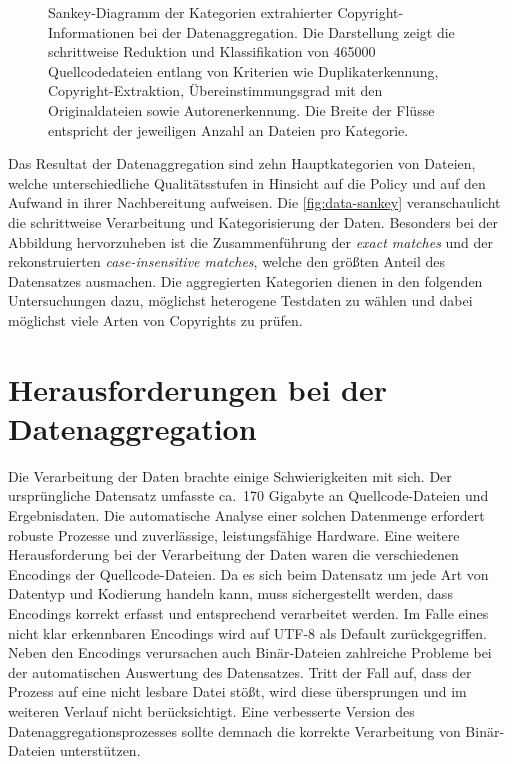 \begin{figure}[ht]
    \centering
    \caption{
Sankey-Diagramm der Kategorien extrahierter Copyright-Informationen bei der Datenaggregation. Die Darstellung zeigt die schrittweise Reduktion und Klassifikation von \num{465000} Quellcodedateien entlang von Kriterien wie Duplikaterkennung, Copyright-Extraktion, Übereinstimmungsgrad mit den Originaldateien sowie Autorenerkennung. Die Breite der Flüsse entspricht der jeweiligen Anzahl an Dateien pro Kategorie.}
    \label{fig:data-sankey}
\end{figure}
Das Resultat der Datenaggregation sind zehn Hauptkategorien von Dateien, welche unterschiedliche Qualitätsstufen in Hinsicht auf die Policy und auf den Aufwand in ihrer Nachbereitung aufweisen.
Die \autoref{fig:data-sankey} veranschaulicht die schrittweise Verarbeitung und Kategorisierung der Daten.
Besonders bei der Abbildung hervorzuheben ist die Zusammenführung der \textit{exact matches} und der rekonstruierten \textit{case-insensitive matches}, welche den größten Anteil des Datensatzes ausmachen.
Die aggregierten Kategorien dienen in den folgenden Untersuchungen dazu, möglichst heterogene Testdaten zu wählen und dabei möglichst viele Arten von Copyrights zu prüfen.


\section{Herausforderungen bei der Datenaggregation}\label{sec:herausforderungen-datenaggregation}

Die Verarbeitung der Daten brachte einige Schwierigkeiten mit sich.
Der ursprüngliche Datensatz umfasste ca.\ 170 Gigabyte an Quellcode-Dateien und Ergebnisdaten.
Die automatische Analyse einer solchen Datenmenge erfordert robuste Prozesse und zuverlässige, leistungsfähige Hardware.
Eine weitere Herausforderung bei der Verarbeitung der Daten waren die verschiedenen Encodings der Quellcode-Dateien.
Da es sich beim Datensatz um jede Art von Datentyp und Kodierung handeln kann, muss sichergestellt werden, dass Encodings korrekt erfasst und entsprechend verarbeitet werden.
Im Falle eines nicht klar erkennbaren Encodings wird auf UTF-8 als Default zurückgegriffen.
Neben den Encodings verursachen auch Binär-Dateien zahlreiche Probleme bei der automatischen Auswertung des Datensatzes.
Tritt der Fall auf, dass der Prozess auf eine nicht lesbare Datei stößt, wird diese übersprungen und im weiteren Verlauf nicht berücksichtigt.
Eine verbesserte Version des Datenaggregationsprozesses sollte demnach die korrekte Verarbeitung von Binär-Dateien unterstützen.

